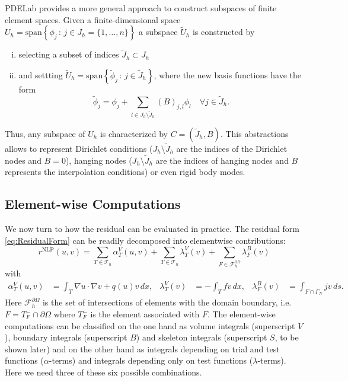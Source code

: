\documentclass[a4paper,12pt]{article}
\begin{document}
PDELab provides a more general approach to construct subspaces of
finite element spaces. Given a
finite-dimensional space $U_h = \text{span}\left\{\phi_j \,:\, j\in J_h=\{1,\ldots,n\}\right\}$
a subspace $\tilde{U}_h$ is constructed by 
\begin{enumerate}[i)]
\item selecting a subset of indices $\tilde{J}_h\subset J_h$
\item and settting $\tilde{U}_h = \text{span}\left\{\tilde\phi_j \,:\, j\in \tilde{J}_h\right\}$,
where the new basis functions have the form 
\begin{equation*}
\tilde\phi_j = \phi_j + \sum_{l\in J_h\setminus\tilde{J}_h} (B)_{j,l} \phi_l \quad \forall j\in \tilde{J}_h.
\end{equation*}
\end{enumerate}
Thus, any subspace of $U_h$ is characterized by $C=(\tilde{J}_h,B)$.
This abstractions allows to represent Dirichlet conditions ($J_h\setminus\tilde{J}_h$
are the indices of the Dirichlet nodes and $B=0$), hanging nodes
($J_h\setminus\tilde{J}_h$ are the indices of hanging nodes and $B$ represents
the interpolation conditions) or even rigid body modes.


\subsection{Element-wise Computations}
\label{Sec:ElementComputations}

We now turn to how the residual can be evaluated in practice.
The residual form \eqref{eq:ResidualForm} can be readily decomposed into
elementwise contributions:
\begin{equation*}
r^{\text{NLP}}\left(u,v\right) =  
\sum_{T\in\mathcal{T}_h} \alpha_T^V(u,v) 
  + \sum_{T\in\mathcal{T}_h} \lambda_T^V(v)
 + \sum_{F\in\mathcal{F}_h^{\partial\Omega}}\lambda_F^B(v)
\end{equation*}
with
\begin{align*}
\alpha_T^V(u,v) &= \int_T \nabla u \cdot \nabla v + q(u) v \,dx, &
\lambda_T^V(v) &= - \int_T f v \,dx, &
\lambda_F^B(v) &= \int_{F\cap\Gamma_N} j v\,ds.
\end{align*}
Here $\mathcal{F}_h^{\partial\Omega}$ is the set of intersections of
elements with the domain boundary, i.e. $F=T_F^-\cap\partial\Omega$
where $T_F^-$ is the element associated with $F$. 
The element-wise computations can be classified on the one hand as volume
integrals (superscript $V$), boundary integrals (superscript $B$) and
skeleton integrals (superscript $S$, to be shown later) and on the
other hand as integrals depending on trial and test functions ($\alpha$-terms)
and integrals depending only on test functions ($\lambda$-terms). Here we need
three of these six possible combinations.
\end{document}
